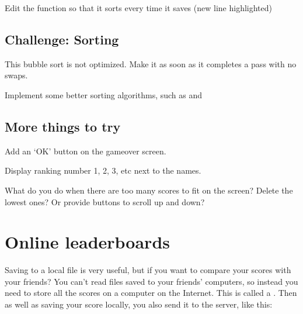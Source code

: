 \documentclass[a4paper,12pt,english]{sphinxmanual}
\begin{document}
\sphinxAtStartPar
Edit the  function so that it sorts every time it saves
(new line highlighted)

\begin{sphinxVerbatim}[commandchars=\\\{\}]
 
       
     
\end{sphinxVerbatim}


\section{Challenge: Sorting}
\label{\detokenize{tutorial:challenge-sorting}}
\sphinxAtStartPar
This bubble sort is not optimized. Make it  as soon as it
completes a pass with no swaps.

\sphinxAtStartPar
Implement some better sorting algorithms, such as  and 


\section{More things to try}
\label{\detokenize{tutorial:more-things-to-try}}
\sphinxAtStartPar
Add an ‘OK’ button on the gameover screen.

\sphinxAtStartPar
Display ranking number 1, 2, 3, etc next to the names.

\sphinxAtStartPar
What do you do when there are too many scores to fit on the screen?
Delete the lowest ones? Or provide buttons to scroll up and down?


\chapter{Online leaderboards}
\label{\detokenize{tutorial:online-leaderboards}}
\sphinxAtStartPar
Saving to a local file is very useful, but if you want to compare your
scores with your friends? You can’t read files saved to your friends’
computers, so instead you need to store all the scores on a computer on
the Internet. This is called a . Then as well as saving your
score locally, you also send it to the server, like this:
\end{document}
